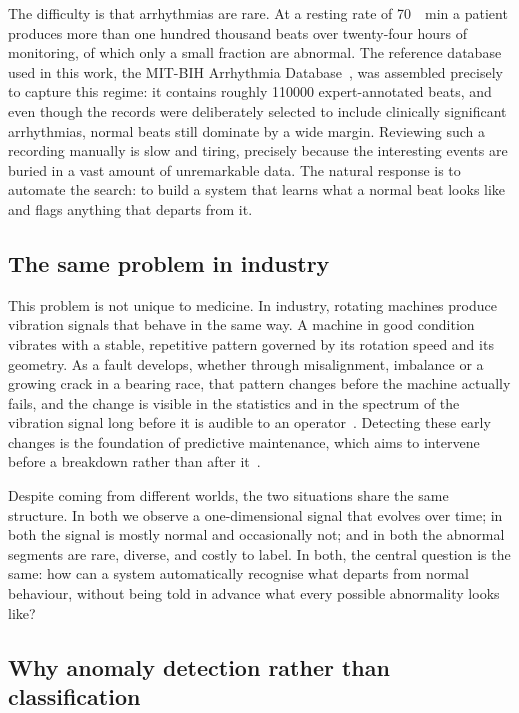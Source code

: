 \documentclass[a4paper, 12pt]{article}
\begin{document}
The difficulty is that arrhythmias are rare. At a resting rate of \SI{70}{\per\minute} a
patient produces more than one hundred thousand beats over twenty-four hours of monitoring,
of which only a small fraction are abnormal. The reference database used in this work, the
MIT-BIH Arrhythmia Database~\cite{moody2001mitbih}, was assembled precisely to capture this
regime: it contains roughly \num{110000} expert-annotated beats, and even though the records
were deliberately selected to include clinically significant arrhythmias, normal beats still
dominate by a wide margin. Reviewing such a recording manually is slow and tiring, precisely
because the interesting events are buried in a vast amount of unremarkable data. The natural
response is to automate the search: to build a system that learns what a normal beat looks
like and flags anything that departs from it.




\subsection{The same problem in industry} \label{subsec:vibration}

This problem is not unique to medicine. In industry, rotating machines produce vibration
signals that behave in the same way. A machine in good condition vibrates with a stable,
repetitive pattern governed by its rotation speed and its geometry. As a fault develops,
whether through misalignment, imbalance or a growing crack in a bearing race, that pattern
changes before the machine actually fails, and the change is visible in the statistics and
in the spectrum of the vibration signal long before it is audible to an
operator~\cite{randall2011bearing}. Detecting these early changes is the foundation of
predictive maintenance, which aims to intervene before a breakdown rather than after
it~\cite{lei2018review}.

Despite coming from different worlds, the two situations share the same structure. In both
we observe a one-dimensional signal that evolves over time; in both the signal is mostly
normal and occasionally not; and in both the abnormal segments are rare, diverse, and costly
to label. In both, the central question is the same: how can a system automatically recognise
what departs from normal behaviour, without being told in advance what every possible
abnormality looks like?

\subsection{Why anomaly detection rather than classification} \label{subsec:why-anomaly-detection}
\end{document}
